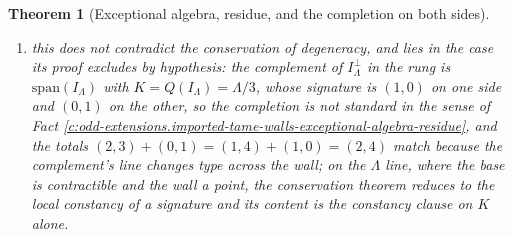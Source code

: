 \documentclass[11pt]{article}
\newtheorem{theorem}{Theorem}[section]
\theoremstyle{definition}
\theoremstyle{plain}
\begin{document}
\begin{theorem}[Exceptional algebra, residue, and the completion on both sides]
\begin{enumerate}
\item[(iv)] this does not contradict the conservation of degeneracy, and lies in the case its proof excludes by hypothesis: the complement of $I_{\Lambda}^{\perp}$ in the rung is $\mathrm{span}(I_{\Lambda})$ with $K = Q(I_{\Lambda}) = \Lambda/3$, whose signature is $(1,0)$ on one side and $(0,1)$ on the other, so the completion is not standard in the sense of Fact \ref{c:odd-extensions.imported-tame-walls-exceptional-algebra-residue}, and the totals $(2,3) + (0,1) = (1,4) + (1,0) = (2,4)$ match because the complement's line changes type across the wall; on the $\Lambda$ line, where the base is contractible and the wall a point, the conservation theorem reduces to the local constancy of a signature and its content is the constancy clause on $K$ alone.
\end{enumerate}
\end{theorem}
\end{document}
